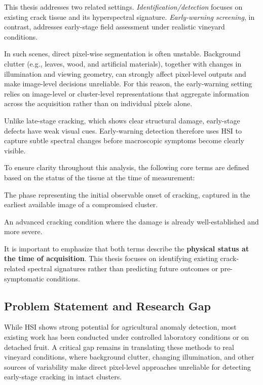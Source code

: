 \medskip
\noindent
This thesis addresses two related settings. \textit{Identification/detection} focuses on existing crack tissue and its hyperspectral signature. \textit{Early-warning screening}, in contrast, addresses early-stage field assessment under realistic vineyard conditions.

\medskip
\noindent
In such scenes, direct pixel-wise segmentation is often unstable. Background clutter (e.g., leaves, wood, and artificial materials), together with changes in illumination and viewing geometry, can strongly affect pixel-level outputs and make image-level decisions unreliable. For this reason, the early-warning setting relies on image-level or cluster-level representations that aggregate information across the acquisition rather than on individual pixels alone.

\medskip
\noindent
Unlike late-stage cracking, which shows clear structural damage, early-stage defects have weak visual cues. Early-warning detection therefore uses HSI to capture subtle spectral changes before macroscopic symptoms become clearly visible.

\medskip
\noindent
To ensure clarity throughout this analysis, the following core terms are defined based on the status of the tissue at the time of measurement:

\begin{description}[style=multiline, leftmargin=3cm, font=\bfseries]
    \item[Early-stage] The phase representing the initial observable onset of cracking, captured in the earliest available image of a compromised cluster.
    \item[Late-stage] An advanced cracking condition where the damage is already well-established and more severe.
\end{description}

\medskip
\noindent
It is important to emphasize that both terms describe the \textbf{physical status at the time of acquisition}. This thesis focuses on identifying existing crack-related spectral signatures rather than predicting future outcomes or pre-symptomatic conditions.

\subsection{Problem Statement and Research Gap}

\noindent
While HSI shows strong potential for agricultural anomaly detection, most existing work has been conducted under controlled laboratory conditions or on detached fruit. A critical gap remains in translating these methods to real vineyard conditions, where background clutter, changing illumination, and other sources of variability make direct pixel-level approaches unreliable for detecting early-stage cracking in intact clusters.

